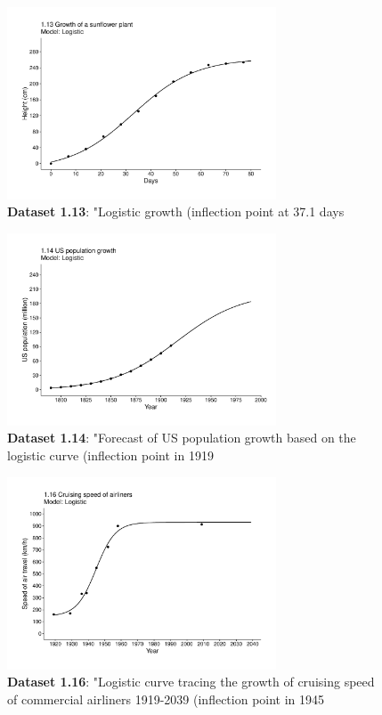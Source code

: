 \documentclass[aps,rmp,preprint,superscriptaddress,10pt,onecolumn]{article}
\begin{document}
\begin{figure}[h]
\includegraphics[width=8cm]{output/figs-ggplot/1.13.pdf}
\caption{\textbf{Dataset 1.13}: "Logistic growth (inflection point at 37.1 days}
\end{figure}
	
\begin{figure}[h]
\includegraphics[width=8cm]{output/figs-ggplot/1.14.pdf}
\caption{\textbf{Dataset 1.14}: "Forecast of US population growth based on the logistic curve (inflection point in 1919}
\end{figure}
	
\begin{figure}[h]
\includegraphics[width=8cm]{output/figs-ggplot/1.16.pdf}
\caption{\textbf{Dataset 1.16}: "Logistic curve tracing the growth of cruising speed of commercial airliners 1919-2039 (inflection point in 1945}
\end{figure}
	
\end{document}
